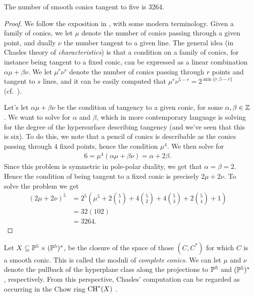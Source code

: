 \documentclass[11pt]{amsart}
\begin{document}
\begin{theorem} The number of smooth conics tangent to five is 3264.
\end{theorem}
\begin{proof} We follow the exposition in \cite{Kleiman-Chasles}, with some modern terminology. Given a family of conics, we let $\mu$ denote the number of conics passing through a given point, and dually $\nu$ the number tangent to a given line. The general idea (in Chasles theory of \textit{characteristics}) is that a condition on a family of conics, for instance being tangent to a fixed conic, can be expressed as a linear combination $\alpha\mu + \beta\nu$. We let $\mu^r \nu^s$ denote the number of conics passing through $r$ points and tangent to $s$ lines, and it can be easily computed that $\mu^{r} \nu^{5-r} = 2^{\min\{r,5-r\}}$ (cf.~\cite[p.~42]{Katz-book}).

Let's let $\alpha\mu + \beta\nu$ be the condition of tangency to a given conic, for some $\alpha,\beta\in\Z$. We want to solve for $\alpha$ and $\beta$, which in more contemporary language is solving for the degree of the hypersurface describing tangency (and we've seen that this is six). To do this, we note that a pencil of conics is describable as the conics passing through $4$ fixed points, hence the condition $\mu^4$. We then solve for
\begin{align*}
    6 = \mu^4 (\alpha\mu + \beta \nu) = \alpha + 2\beta.
\end{align*}
Since this problem is symmetric in pole-polar duality, we get that $\alpha = \beta = 2$. Hence the condition of being tangent to a fixed conic is precisely $2\mu + 2\nu$. To solve the problem we get
\begin{align*}
    (2\mu + 2\nu)^5 &= 2^5 \left( \mu^5 + 2\binom{5}{1} + 4\binom{5}{2} + 4\binom{5}{3} + 2\binom{5}{4} + 1  \right) \\
    &= 32(102) \\
    &= 3264.
\end{align*}
\end{proof}

\begin{remark} Let $X \subseteq \P^5 \times (\P^5)^\ast$,
be the closure of the space of those $(C,C^\ast)$ for which $C$ is a smooth conic. This is called the moduli of \textit{complete conics}. We can let $\mu$ and $\nu$ denote the pullback of the hyperplane class along the projections to $\P^5$ and $(\P^5)^\ast$, respectively. From this perspective, Chasles' computation can be regarded as occurring in the Chow ring $\CH^\ast(X)$ \cite[Chapter~8]{3264}.
\end{remark}
\end{document}
